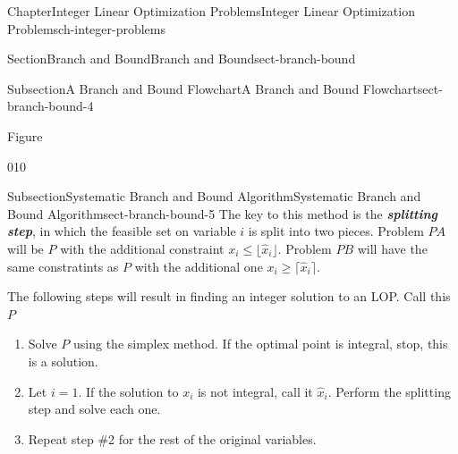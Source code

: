 \documentclass[oneside,10pt,]{book}
\newcommand{\alert}[1]{\textbf{\textit{#1}}}
\numberwithin{equation}{section}
\begin{document}
\begin{chapterptx}{Chapter}{Integer Linear Optimization Problems}{}{Integer Linear Optimization Problems}{}{}{ch-integer-problems}
\begin{sectionptx}{Section}{Branch and Bound}{}{Branch and Bound}{}{}{sect-branch-bound}
\begin{subsectionptx}{Subsection}{A Branch and Bound Flowchart}{}{A Branch and Bound Flowchart}{}{}{sect-branch-bound-4}
\begin{figureptx}{Figure}
\begin{image}{0}{1}{0}{}
{%
}%
\end{image}%
\tcblower
\end{figureptx}%
\end{subsectionptx}
%
%
\typeout{************************************************}
\typeout{************************************************}
%
\begin{subsectionptx}{Subsection}{Systematic Branch and Bound Algorithm}{}{Systematic Branch and Bound Algorithm}{}{}{sect-branch-bound-5}
The key to this method is the \alert{splitting step}, in which the feasible set on variable \(i\) is split into two pieces. Problem \(PA\) will be \(P\) with the additional constraint \(x_i \leq \lfloor \hat{x}_i \rfloor\). Problem \(PB\) will have the same constratints as \(P\) with the additional one \(x_i \geq \lceil \hat{x}_i \rceil\).%
\par
The following steps will result in finding an integer solution to an LOP. Call this \(P\)%
\par
%
\begin{enumerate}
\item{}Solve \(P\) using the simplex method. If the optimal point is integral, stop, this is a solution.%
\item{}Let \(i=1\). If the solution to \(x_i\) is not integral, call it \(\hat{x}_i\). Perform the splitting step and solve each one.%
\item{}Repeat step \#2 for the rest of the original variables.%

\end{enumerate}
\end{subsectionptx}
\end{sectionptx}
\end{chapterptx}
\end{document}
